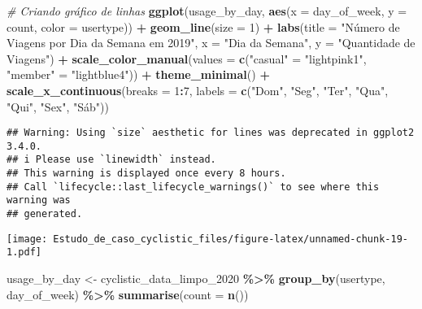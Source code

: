 \documentclass[
]{article}
\newenvironment{Shaded}{\begin{snugshade}}{\end{snugshade}}
\newcommand{\AttributeTok}[1]{\textcolor[rgb]{0.13,0.29,0.53}{#1}}
\newcommand{\CommentTok}[1]{\textcolor[rgb]{0.56,0.35,0.01}{\textit{#1}}}
\newcommand{\DecValTok}[1]{\textcolor[rgb]{0.00,0.00,0.81}{#1}}
\newcommand{\FunctionTok}[1]{\textcolor[rgb]{0.13,0.29,0.53}{\textbf{#1}}}
\newcommand{\NormalTok}[1]{#1}
\newcommand{\OtherTok}[1]{\textcolor[rgb]{0.56,0.35,0.01}{#1}}
\newcommand{\SpecialCharTok}[1]{\textcolor[rgb]{0.81,0.36,0.00}{\textbf{#1}}}
\newcommand{\StringTok}[1]{\textcolor[rgb]{0.31,0.60,0.02}{#1}}
\begin{document}
\begin{Shaded}
\begin{Highlighting}[]
\CommentTok{\# Criando gráfico de linhas}
\FunctionTok{ggplot}\NormalTok{(usage\_by\_day, }\FunctionTok{aes}\NormalTok{(}\AttributeTok{x =}\NormalTok{ day\_of\_week, }\AttributeTok{y =}\NormalTok{ count, }\AttributeTok{color =}\NormalTok{ usertype)) }\SpecialCharTok{+}
  \FunctionTok{geom\_line}\NormalTok{(}\AttributeTok{size =} \DecValTok{1}\NormalTok{) }\SpecialCharTok{+}
  \FunctionTok{labs}\NormalTok{(}\AttributeTok{title =} \StringTok{"Número de Viagens por Dia da Semana em 2019"}\NormalTok{, }\AttributeTok{x =} \StringTok{"Dia da Semana"}\NormalTok{, }\AttributeTok{y =} \StringTok{"Quantidade de Viagens"}\NormalTok{) }\SpecialCharTok{+}
  \FunctionTok{scale\_color\_manual}\NormalTok{(}\AttributeTok{values =} \FunctionTok{c}\NormalTok{(}\StringTok{"casual"} \OtherTok{=} \StringTok{"lightpink1"}\NormalTok{, }\StringTok{"member"} \OtherTok{=} \StringTok{"lightblue4"}\NormalTok{)) }\SpecialCharTok{+}
  \FunctionTok{theme\_minimal}\NormalTok{() }\SpecialCharTok{+}
  \FunctionTok{scale\_x\_continuous}\NormalTok{(}\AttributeTok{breaks =} \DecValTok{1}\SpecialCharTok{:}\DecValTok{7}\NormalTok{, }\AttributeTok{labels =} \FunctionTok{c}\NormalTok{(}\StringTok{"Dom"}\NormalTok{, }\StringTok{"Seg"}\NormalTok{, }\StringTok{"Ter"}\NormalTok{, }\StringTok{"Qua"}\NormalTok{, }\StringTok{"Qui"}\NormalTok{, }\StringTok{"Sex"}\NormalTok{, }\StringTok{"Sáb"}\NormalTok{))}
\end{Highlighting}
\end{Shaded}

\begin{verbatim}
## Warning: Using `size` aesthetic for lines was deprecated in ggplot2 3.4.0.
## i Please use `linewidth` instead.
## This warning is displayed once every 8 hours.
## Call `lifecycle::last_lifecycle_warnings()` to see where this warning was
## generated.
\end{verbatim}

\texttt{[image: Estudo\_de\_caso\_cyclistic\_files/figure-latex/unnamed-chunk-19-1.pdf]}

\begin{Shaded}
\begin{Highlighting}[]
\NormalTok{usage\_by\_day }\OtherTok{\textless{}{-}}\NormalTok{ cyclistic\_data\_limpo\_2020 }\SpecialCharTok{\%\textgreater{}\%}
  \FunctionTok{group\_by}\NormalTok{(usertype, day\_of\_week) }\SpecialCharTok{\%\textgreater{}\%}
  \FunctionTok{summarise}\NormalTok{(}\AttributeTok{count =} \FunctionTok{n}\NormalTok{())}
\end{Highlighting}
\end{Shaded}
\end{document}
